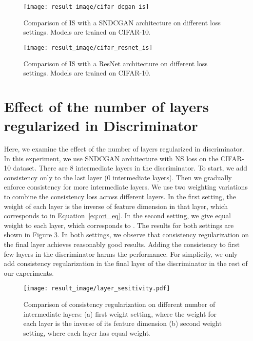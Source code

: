 \documentclass{article} \usepackage{iclr2020_conference,times}
\begin{document}
\begin{figure}[hbt!]
    \centering
    \texttt{[image: result\_image/cifar\_dcgan\_is]}
    \caption{
    Comparison of IS with a SNDCGAN architecture on different loss settings. Models are trained on CIFAR-10.
    }
    \label{fig:cifar_dcgan_is}
\end{figure}

\begin{figure}[hbt!]
    \centering
    \texttt{[image: result\_image/cifar\_resnet\_is]}
    \caption{
    Comparison of IS with a ResNet architecture on different loss settings. Models are trained on CIFAR-10.
    }
    \label{fig:cifar_resnet_is}
\end{figure}


\section {Effect of the number of layers regularized in Discriminator } \label{sec:num_layers}

\renewcommand{\thefigure}{G\arabic{figure}}
\setcounter{figure}{0}
\renewcommand{\thetable}{G\arabic{table}}
\setcounter{table}{0}

Here, we examine the effect of the number of layers regularized in discriminator.
In this experiment, we use SNDCGAN architecture with NS loss on the CIFAR-10 dataset.
There are 8 intermediate layers in the discriminator.
To start, we add consistency only to the last layer (0 intermediate layers).
Then we gradually enforce consistency for more intermediate layers.
We use two weighting variations to combine the consistency loss across different layers.
In the first setting, the weight of each layer is the inverse of feature dimension  in that layer,
which corresponds to  in Equation~\ref{eq:ori_eq}.
In the second setting, we give equal weight to each layer, which corresponds to  .
The results for both settings are shown in Figure \ref{fig:layer_sensitivity}.
In both settings, we observe that consistency regularization on the final layer achieves reasonably good results.
Adding the consistency to first few layers in the discriminator harms the performance.
For simplicity, we only add consistency regularization in the final layer of the discriminator in the rest of our experiments. 

\begin{figure}[hbt!]
    \centering
    \texttt{[image: result\_image/layer\_sesitivity.pdf]}
    \caption{
    Comparison of consistency regularization on different number of intermediate layers: (a) first weight setting, where the weight for each layer is the inverse of its feature dimension (b) second weight setting, where each layer has equal weight. 
    }
    \label{fig:layer_sensitivity}
\end{figure}
\end{document}

